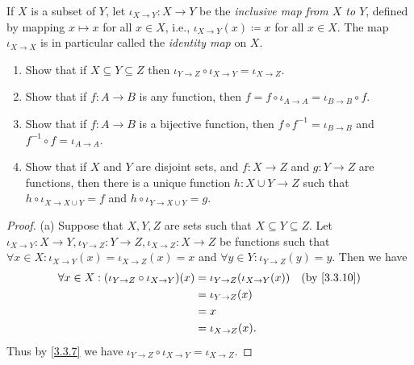 \begin{ex}\label{ex:3.3.8}
  If \(X\) is a subset of \(Y\), let \(\iota_{X \to Y} : X \to Y\) be the \emph{inclusive map from \(X\) to \(Y\)}, defined by mapping \(x \mapsto x\) for all \(x \in X\), i.e., \(\iota_{X \to Y}(x) \coloneqq x\) for all \(x \in X\).
  The map \(\iota_{X \to X}\) is in particular called the \emph{identity map} on \(X\).
  \begin{enumerate}
    \item Show that if \(X \subseteq Y \subseteq Z\) then \(\iota_{Y \to Z} \circ \iota_{X \to Y} = \iota_{X \to Z}\).
    \item Show that if \(f : A \to B\) is any function, then \(f = f \circ \iota_{A \to A} = \iota_{B \to B} \circ f\).
    \item Show that if \(f : A \to B\) is a bijective function, then \(f \circ f^{-1} = \iota_{B \to B}\) and \(f^{-1} \circ f = \iota_{A \to A}\).
    \item Show that if \(X\) and \(Y\) are disjoint sets, and \(f : X \to Z\) and \(g : Y \to Z\) are functions, then there is a unique function \(h : X \cup Y \to Z\) such that \(h \circ \iota_{X \to X \cup Y} = f\) and \(h \circ \iota_{Y \to X \cup Y} = g\).
  \end{enumerate}
\end{ex}

\begin{proof}{(a)}
  Suppose that \(X, Y, Z\) are sets such that \(X \subseteq Y \subseteq Z\).
  Let \(\iota_{X \to Y} : X \to Y, \iota_{Y \to Z} : Y \to Z, \iota_{X \to Z} : X \to Z\) be functions such that \(\forall x \in X : \iota_{X \to Y}(x) = \iota_{X \to Z}(x) = x\) and \(\forall y \in Y : \iota_{Y \to Z}(y) = y\).
  Then we have
  \begin{align*}
    \forall x \in X : (\iota_{Y \to Z} \circ \iota_{X \to Y})(x) & = \iota_{Y \to Z}(\iota_{X \to Y}(x)) &  & \by{3.3.10} \\
                                                                 & = \iota_{Y \to Z}(x)                                   \\
                                                                 & = x                                                    \\
                                                                 & = \iota_{X \to Z}(x).
  \end{align*}
  Thus by \cref{3.3.7} we have \(\iota_{Y \to Z} \circ \iota_{X \to Y} = \iota_{X \to Z}\).
\end{proof}

